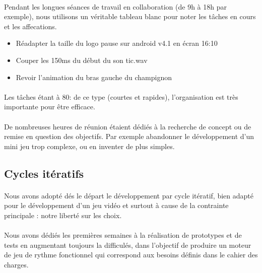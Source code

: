 \paragraph{}
Pendant les longues séances de travail en collaboration (de 9h à 18h par exemple), nous utilisons un véritable tableau blanc pour noter les tâches en cours et les affecations.

\begin{itemize}
\item Réadapter la taille du logo pause sur android v4.1 en écran 16:10
\item Couper les 150ms du début du son tic.wav
\item Revoir l’animation du bras gauche du champignon
\end{itemize}

\paragraph{}
Les tâches étant à 80: de ce type (courtes et rapides), l’organisation est très importante pour être efficace.

\paragraph{}
De nombreuses heures de réunion étaient dédiés à la recherche de concept ou de remise en question des objectifs. Par exemple abandonner le développement d’un mini jeu trop complexe, ou en inventer de plus simples.

\subsection{Cycles itératifs}

\paragraph{}
Nous avons adopté dés le départ le développement par cycle itératif, bien adapté pour le développement d’un jeu vidéo et surtout à cause de la contrainte principale : notre liberté sur les choix.

\paragraph{}
Nous avons dédiés les premières semaines à la réalisation de prototypes et de tests en augmentant toujours la difficulés, dans l’objectif de produire un moteur de jeu de rythme fonctionnel qui correspond aux besoins définis dans le cahier des charges.

